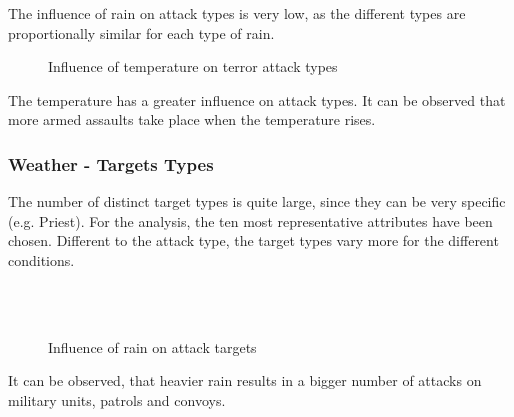 The influence of rain on attack types is very low, as the different types are proportionally similar for each type of rain.

\newpage

\begin{figure}[!hbt]
\centering
    \qquad
    \qquad
    \qquad
    \qquad
    \qquad
\caption{Influence of temperature on terror attack types}
\label{fig:example subfigure}
\end{figure}

The temperature has a greater influence on attack types. It can be observed that more armed assaults take place when the temperature rises.

\newpage

\subsubsection{Weather - Targets Types}
The number of distinct target types is quite large, since they can be very specific (e.g. Priest). For the analysis, the ten most representative attributes have been chosen. Different to the attack type, the target types vary more for the different conditions.

\begin{figure}[!ht]
\centering
    \qquad\\
    \qquad
    \qquad\\
    \qquad
\caption{Influence of rain on attack targets}
\end{figure}

It can be observed, that heavier rain results in a bigger number of attacks on military units, patrols and convoys.

